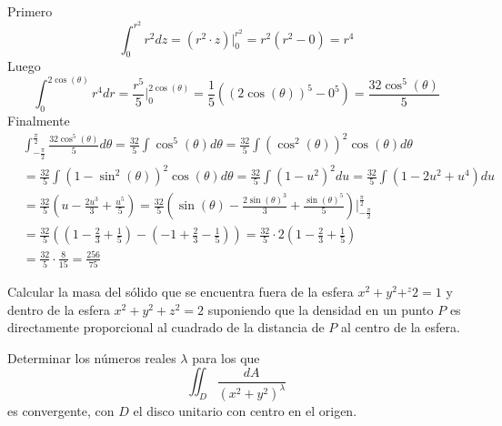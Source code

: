 \documentclass{article}
\begin{document}
\begin{enumerate}
{						Primero
						\[
							\int_{0}^{r^2}{r^2dz} = (r^2 \cdot z) \Big |_0^{r^2}
							= r^2 (r^2 - 0) = r^4
						\]
						Luego
						\[
							\int_{0}^{2\cos(\theta)}{r^4dr}
							= \frac{r^5}{5} \Big |_{0}^{2\cos(\theta)}
							= \frac{1}{5} ((2\cos(\theta))^5 - 0^5)
							= \frac{32\cos^5(\theta)}{5}
						\]
						Finalmente
						\begin{align*}
							&\int_{-\frac{\pi}{2}}^{\frac{\pi}{2}}{\frac{32\cos^5(\theta)}{5}d\theta}
							= \frac{32}{5} \int{\cos^5(\theta)d\theta}
							= \frac{32}{5} \int{(\cos^2(\theta))^2\cos(\theta)d\theta}\\
							&= \frac{32}{5} \int{(1-\sin^2(\theta))^2\cos(\theta)d\theta}
							= \frac{32}{5} \int{(1-u^2)^2du}
							= \frac{32}{5} \int{(1-2u^2+u^4)du}\\
							&= \frac{32}{5} (u - \frac{2u^3}{3} + \frac{u^5}{5})
							= \frac{32}{5} (\sin(\theta) - \frac{2\sin(\theta)^3}{3}
							+ \frac{\sin(\theta)^5}{5}) \Big |_{-\frac{\pi}{2}}^{\frac{\pi}{2}}\\
							&= \frac{32}{5} ((1-\frac{2}{3}+\frac{1}{5})-(-1+\frac{2}{3}-\frac{1}{5}))
							= \frac{32}{5} \cdot 2(1-\frac{2}{3}+\frac{1}{5})\\
							&= \frac{32}{5} \cdot \frac{8}{15} = \frac{256}{75}
\end{align*}

        \item {
            Calcular la masa del sólido que se encuentra fuera de la esfera
            $x^2+y^2+^z2=1$ y dentro de la esfera $x^2+y^2+z^2=2$ suponiendo
            que la densidad en un punto $P$ es directamente proporcional al
            cuadrado de la distancia de $P$ al centro de la esfera.

            \color{azul}
        }

        \item {
            Determinar los números reales $\lambda$ para los que
            \[
                \iint_D {\frac{dA}{\left(x^2+y^2\right)^\lambda}}
            \]
            es convergente, con $D$ el disco unitario con centro en el origen.

}}
\end{enumerate}
\end{document}
